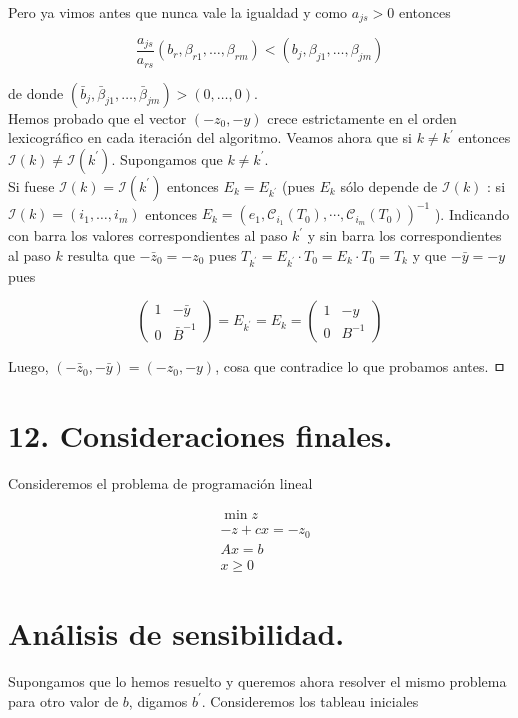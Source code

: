 \documentclass[10pt]{article}
\begin{document}
Pero ya vimos antes que nunca vale la igualdad y como $a_{j s}>0$ entonces

$$
\frac{a_{j s}}{a_{r s}}\left(b_{r}, \beta_{r 1}, \ldots, \beta_{r m}\right)<\left(b_{j}, \beta_{j 1}, \ldots, \beta_{j m}\right)
$$

de donde $\left(\bar{b}_{j}, \bar{\beta}_{j 1}, \ldots, \bar{\beta}_{j m}\right)>(0, \ldots, 0)$.\\
Hemos probado que el vector $\left(-z_{0},-y\right)$ crece estrictamente en el orden lexicográfico en cada iteración del algoritmo. Veamos ahora que si $k \neq k^{\prime}$ entonces $\mathcal{I}(k) \neq \mathcal{I}\left(k^{\prime}\right)$. Supongamos que $k \neq k^{\prime}$.\\
Si fuese $\mathcal{I}(k)=\mathcal{I}\left(k^{\prime}\right)$ entonces $E_{k}=E_{k^{\prime}}$ (pues $E_{k}$ sólo depende de $\mathcal{I}(k)$ : si $\mathcal{I}(k)=\left(i_{1}, \ldots, i_{m}\right)$ entonces $E_{k}=\left(e_{1}, \mathcal{C}_{i_{1}}\left(T_{0}\right), \cdots, \mathcal{C}_{i_{m}}\left(T_{0}\right)\right)^{-1}$ ). Indicando con barra los valores correspondientes al paso $k^{\prime}$ y sin barra los correspondientes al paso $k$ resulta que $-\bar{z}_{0}=-z_{0}$ pues $T_{k^{\prime}}=E_{k^{\prime}} \cdot T_{0}=E_{k} \cdot T_{0}=T_{k}$ y que $-\bar{y}=-y$ pues

$$
\left(\begin{array}{cc}
1 & -\bar{y} \\
0 & \bar{B}^{-1}
\end{array}\right)=E_{k^{\prime}}=E_{k}=\left(\begin{array}{cc}
1 & -y \\
0 & B^{-1}
\end{array}\right)
$$

Luego, $\left(-\bar{z}_{0},-\bar{y}\right)=\left(-z_{0},-y\right)$, cosa que contradice lo que probamos antes. ㅁ

\section*{12. Consideraciones finales.}
Consideremos el problema de programación lineal

$$
\begin{aligned}
& \min z \\
& -z+c x=-z_{0} \\
& A x=b \\
& x \geq 0
\end{aligned}
$$

\section*{Análisis de sensibilidad.}
Supongamos que lo hemos resuelto y queremos ahora resolver el mismo problema para otro valor de $b$, digamos $b^{\prime}$. Consideremos los tableau iniciales
\end{document}
